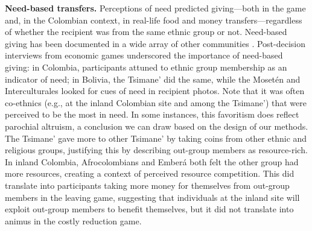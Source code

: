 \documentclass[bibauthoryear]{aa}
\begin{document}
\textbf{Need-based transfers.} Perceptions of need predicted giving---both in the game and, in the Colombian context, in real-life food and money transfers---regardless of whether the recipient was from the same ethnic group or not. Need-based giving has been documented in a wide array of other communities \citep[e.g., ][]{peterson1993demand, hooper2015inclusive, aktipis2016cooperation, hao2015need, gervais2017rich, cronk2019managing}. Post-decision interviews from economic games underscored the importance of need-based giving: in Colombia, participants attuned to ethnic group membership as an indicator of need; in Bolivia, the Tsimane' did the same, while the Moset\'en and Interculturales looked for cues of need in recipient photos. Note that it was often co-ethnics (e.g., at the inland Colombian site and among the Tsimane') that were perceived to be the most in need. In some instances, this favoritism does reflect parochial altruism, a conclusion we can draw based on the design of our methods. The Tsimane' gave more to other Tsimane' by taking coins from other ethnic and religious groups, justifying this by describing out-group members as resource-rich. In inland Colombia, Afrocolombians and Ember\'a both felt the other group had more resources, creating a context of perceived resource competition. This did translate into participants taking more money for themselves from out-group members in the leaving game, suggesting that individuals at the inland site will exploit out-group members to benefit themselves, but it did not translate into animus in the costly reduction game.
\end{document}
